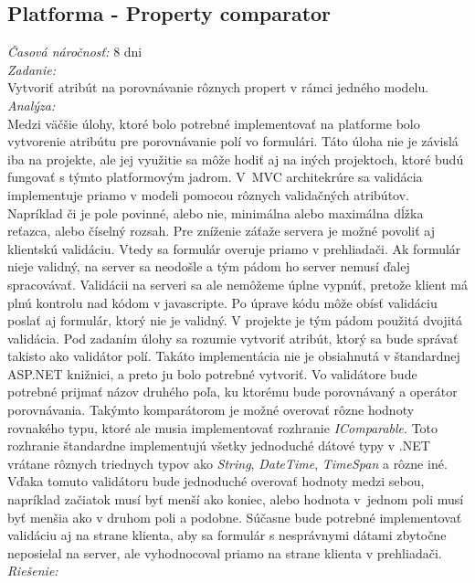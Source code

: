 \documentclass[11pt, oneside]{report}
\begin{document}
\subsection{Platforma - Property  comparator}\label{sssec:num1}
\textit{Časová náročnosť:} 8 dni\\
\textit{Zadanie:}\\
Vytvoriť atribút na porovnávanie rôznych propert v rámci jedného modelu.
\\\textit{Analýza:}\\
Medzi väčšie  úlohy, ktoré  bolo potrebné implementovať na platforme bolo vytvorenie atribútu pre porovnávanie polí vo formulári. Táto úloha nie je  závislá iba na projekte, ale  jej využitie sa môže hodiť aj na iných projektoch, ktoré budú fungovať s týmto platformovým jadrom. V~MVC architekrúre sa validácia implementuje priamo v modeli pomocou rôznych validačných atribútov. Napríklad či je pole povinné, alebo nie, minimálna alebo maximálna dĺžka reťazca, alebo číselný rozsah. Pre zníženie záťaže servera je možné povoliť aj klientskú validáciu. Vtedy sa formulár overuje priamo v prehliadači. Ak formulár nieje  validný, na server sa neodošle a tým pádom ho server nemusí ďalej spracovávať. Validácii na serveri sa ale nemôžeme úplne vypnúť, pretože klient  má plnú kontrolu nad kódom v javascripte. Po úprave kódu môže obísť validáciu poslať aj formulár, ktorý nie je validný. V projekte je tým pádom použitá dvojitá validácia. Pod zadaním úlohy sa rozumie vytvoriť atribút, ktorý sa bude správať takisto ako validátor polí. Takáto implementácia nie je obsiahnutá v štandardnej ASP.NET knižnici, a preto ju bolo potrebné vytvoriť. Vo validátore bude potrebné prijmať názov druhého poľa, ku ktorému bude porovnávaný a operátor porovnávania. Takýmto komparátorom je možné overovať rôzne hodnoty rovnakého typu, ktoré ale musia implementovať rozhranie \textit{IComparable}. Toto rozhranie štandardne implementujú všetky jednoduché dátové typy v .NET vrátane rôznych triednych typov ako \textit{String}, \textit{DateTime}, \textit{TimeSpan} a rôzne iné.  Vďaka tomuto validátoru bude jednoduché overovať hodnoty medzi sebou, napríklad začiatok musí byť menší ako koniec, alebo hodnota v~jednom poli musí byť menšia ako v druhom poli a podobne. Súčasne bude potrebné implementovať validáciu aj na strane klienta, aby sa  formulár s nesprávnymi dátami zbytočne neposielal na server, ale vyhodnocoval priamo  na strane klienta v prehliadači.
\\\textit{Riešenie:}\\
\end{document}
